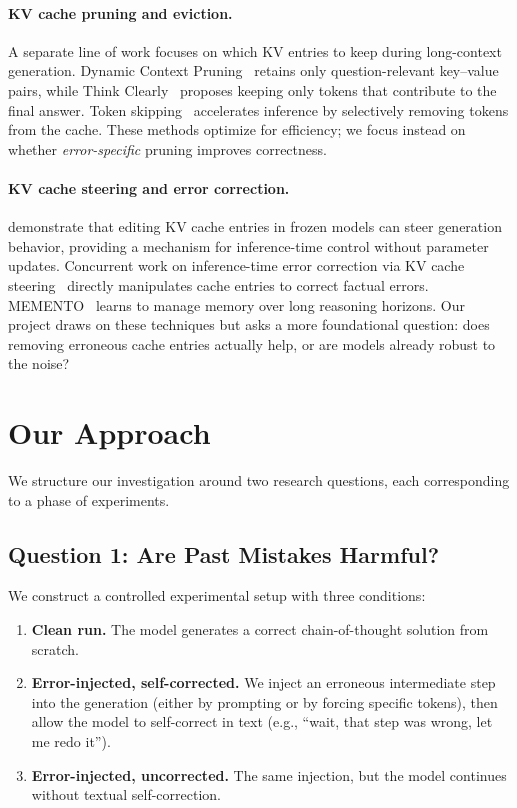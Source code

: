 \documentclass[11pt,a4paper]{article}
\begin{document}
\paragraph{KV cache pruning and eviction.}
A separate line of work focuses on which KV entries to keep during long-context generation.
Dynamic Context Pruning~\cite{dycp2025} retains only question-relevant key--value pairs, while Think Clearly~\cite{thinkclearly2025} proposes keeping only tokens that contribute to the final answer.
Token skipping~\cite{tokenskipping2025} accelerates inference by selectively removing tokens from the cache.
These methods optimize for efficiency; we focus instead on whether \emph{error-specific} pruning improves correctness.

\paragraph{KV cache steering and error correction.}
 demonstrate that editing KV cache entries in frozen models can steer generation behavior, providing a mechanism for inference-time control without parameter updates.
Concurrent work on inference-time error correction via KV cache steering~\cite{errorcorrection2025} directly manipulates cache entries to correct factual errors.
MEMENTO~\cite{memento2025} learns to manage memory over long reasoning horizons.
Our project draws on these techniques but asks a more foundational question: does removing erroneous cache entries actually help, or are models already robust to the noise?

\section{Our Approach}

We structure our investigation around two research questions, each corresponding to a phase of experiments.

\subsection{Question 1: Are Past Mistakes Harmful?}

We construct a controlled experimental setup with three conditions:
\begin{enumerate}
    \item \textbf{Clean run.} The model generates a correct chain-of-thought solution from scratch.
    \item \textbf{Error-injected, self-corrected.} We inject an erroneous intermediate step into the generation (either by prompting or by forcing specific tokens), then allow the model to self-correct in text (e.g., ``wait, that step was wrong, let me redo it'').
    \item \textbf{Error-injected, uncorrected.} The same injection, but the model continues without textual self-correction.
\end{enumerate}
\end{document}

